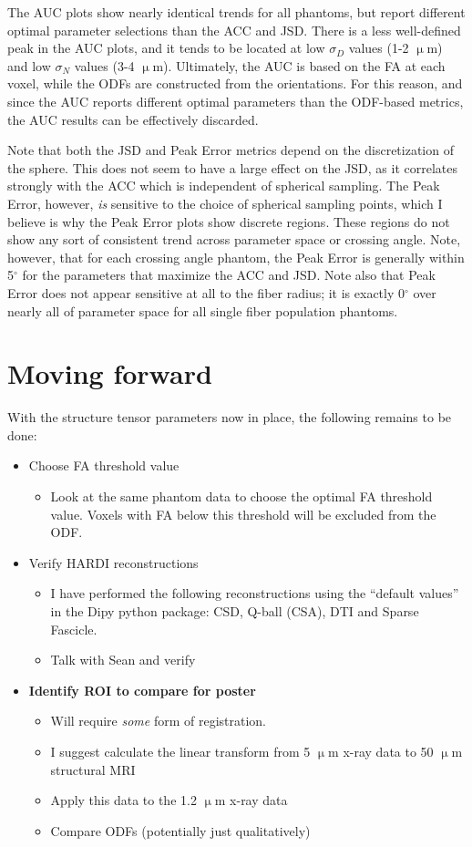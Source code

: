 \documentclass[11pt]{article}
\begin{document}
The AUC plots show nearly identical trends for all phantoms, but report
different optimal parameter selections than the ACC and JSD. There is a
less well-defined peak in the AUC plots, and it tends to be located at low 
$\sigma_D$ values (1-2 $\upmu$m) and low $\sigma_N$ values (3-4 $\upmu$m).
Ultimately, the AUC is based on the FA at each voxel, while the ODFs are
constructed from the orientations. For this reason, and since the AUC
reports different optimal parameters than the ODF-based metrics, the AUC
results can be effectively discarded. 

Note that both the JSD and Peak Error metrics depend on the discretization of
the sphere. This does not seem to have a large effect on the JSD, as it
correlates strongly with the ACC which is independent of spherical sampling.
The Peak Error, however, \textit{is} sensitive to the choice of spherical
sampling points, which I believe is why the Peak Error plots show discrete
regions. These regions do not show any sort of consistent trend across parameter
space or crossing angle. Note, however, that for each crossing angle phantom,
the Peak Error is generally within 5$^{\circ}$ for the parameters that maximize
the ACC and JSD. Note also that Peak Error does not appear sensitive at all to
the fiber radius; it is exactly 0$^{\circ}$ over nearly all of parameter space
for all single fiber population phantoms.

\section{Moving forward}
With the structure tensor parameters now in place, the following remains to be done:
\begin{itemize}
\item Choose FA threshold value
  \begin{itemize}
  \item Look at the same phantom data to choose the optimal FA threshold value. Voxels
    with FA below this threshold will be excluded from the ODF. 
  \end{itemize}
  \newpage
\item Verify HARDI reconstructions
  \begin{itemize}
  \item I have performed the following reconstructions using the ``default
    values'' in the Dipy python package: CSD, Q-ball (CSA), DTI and Sparse
    Fascicle.
  \item Talk with Sean and verify
  \end{itemize}
\item \textbf{Identify ROI to compare for poster}
  \begin{itemize}
  \item Will require \textit{some} form of registration.
  \item I suggest calculate the linear transform from 5 $\upmu$m x-ray data to 50 $\upmu$m structural MRI
  \item Apply this data to the 1.2 $\upmu$m x-ray data
  \item Compare ODFs (potentially just qualitatively) 
  \end{itemize}
\end{itemize}
\end{document}
